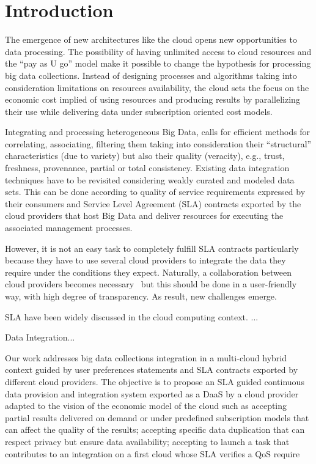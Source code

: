 \section{Introduction}
\label{sec:intro}


The emergence of new architectures like the cloud opens new opportunities to data processing. 
The possibility of having unlimited access to cloud resources and the ``pay as U go'' model make it possible to change the hypothesis for processing big  data collections.  Instead of designing processes and algorithms taking into consideration  limitations on resources availability, the cloud sets the focus on the economic cost implied of using resources and producing results by parallelizing their use while delivering data under subscription oriented cost models.
 
Integrating and processing heterogeneous Big Data, calls for efficient methods for correlating, associating, filtering them taking into consideration their ``structural'' characteristics (due to variety) but also their quality (veracity), e.g., trust, freshness, provenance, partial or total consistency. 
Existing data integration techniques have to be revisited considering weakly curated and modeled data sets. This can be done according to quality of service requirements expressed by their consumers and Service Level Agreement (SLA) contracts exported by the cloud providers that host  Big Data and deliver resources for executing the associated management processes.

However, it is not an easy task to completely fulfill   SLA contracts particularly because they have to use several cloud providers to integrate the data they require under the conditions they expect.
Naturally, a collaboration between cloud providers becomes necessary~\cite{036} but this should be done in a user-friendly way, with high degree of transparency. As result, new challenges emerge.

SLA have been widely discussed in the cloud computing context. ...

Data Integration...


Our work addresses big data collections integration  in a multi-cloud hybrid context guided by user preferences statements and SLA contracts exported by different cloud providers. The objective is to propose an SLA guided continuous data provision and integration system exported as a DaaS by a cloud provider adapted to the vision of the economic model of the cloud such as accepting partial results delivered on demand or under predefined subscription models that can affect the quality of the results; accepting specific data duplication that can respect privacy but ensure data availability; accepting to launch a task that contributes to an integration on a first cloud whose SLA verifies a QoS require



